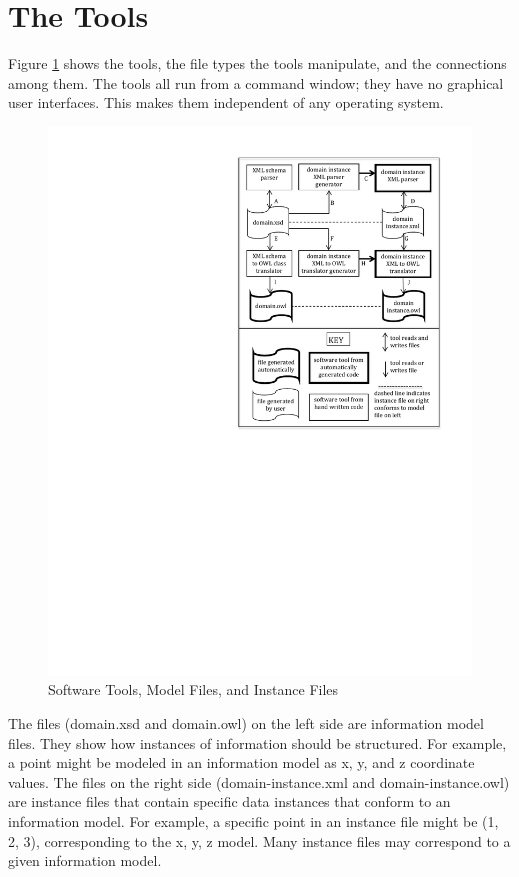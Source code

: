 \documentclass[preprint,12pt]{elsarticle}
\begin{document}
\section{The Tools}
\label{tools}

Figure \ref{flowchart} shows the tools, the file types the tools
manipulate, and the connections among them. The tools all run from a
command window; they have no graphical user interfaces. This makes them
independent of any operating system.

\begin{figure}
	\centering
	\includegraphics [width=0.8 \textwidth]{ConversionChart2014Feb2c.pdf}
	\caption{Software Tools, Model Files, and Instance Files}
	\label{flowchart}
\end{figure}

The files (domain.xsd and domain.owl) on the left side are information
model files. They show how instances of information should be structured.
For example, a point might be modeled in an information model as x, y, and
z coordinate values. The files on the right side (domain-instance.xml and
domain-instance.owl) are instance files that contain specific data
instances that conform to an information model. For example, a specific
point in an instance file might be (1, 2, 3), corresponding to the x, y, z
model. Many instance files may correspond to a given information model.
\end{document}
